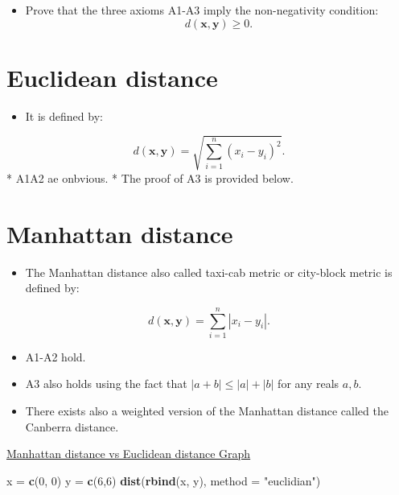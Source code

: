 \documentclass[
]{article}
\newenvironment{Shaded}{\begin{snugshade}}{\end{snugshade}}
\newcommand{\DataTypeTok}[1]{\textcolor[rgb]{0.13,0.29,0.53}{#1}}
\newcommand{\DecValTok}[1]{\textcolor[rgb]{0.00,0.00,0.81}{#1}}
\newcommand{\KeywordTok}[1]{\textcolor[rgb]{0.13,0.29,0.53}{\textbf{#1}}}
\newcommand{\NormalTok}[1]{#1}
\newcommand{\StringTok}[1]{\textcolor[rgb]{0.31,0.60,0.02}{#1}}
\providecommand{\tightlist}{%
  \setlength{\itemsep}{0pt}\setlength{\parskip}{0pt}}
\begin{document}
\begin{itemize}
\tightlist
\item
  Prove that the three axioms A1-A3 imply the non-negativity condition:
  \[d(\mathbf{x},\mathbf{y})\geq 0.\]
\end{itemize}

\hypertarget{euclidean-distance}{%
\section{Euclidean distance}\label{euclidean-distance}}

\begin{itemize}
\tightlist
\item
  It is defined by:
\end{itemize}

\[d(\mathbf{x},\mathbf{y})=\sqrt{\sum_{i=1}^n (x_i-y_i)^2}.\] * A1A2 ae
onbvious. * The proof of A3 is provided below.

\hypertarget{manhattan-distance}{%
\section{Manhattan distance}\label{manhattan-distance}}

\begin{itemize}
\tightlist
\item
  The Manhattan distance also called taxi-cab metric or city-block
  metric is defined by:
\end{itemize}

\[d(\mathbf{x},\mathbf{y})
=\sum_{i=1}^n |x_i-y_i|.
\]

\begin{itemize}
\tightlist
\item
  A1-A2 hold.
\item
  A3 also holds using the fact that \(|a+b|\leq |a|+|b|\) for any reals
  \(a,b\).
\item
  There exists also a weighted version of the Manhattan distance called
  the Canberra distance.
\end{itemize}

\href{https://upload.wikimedia.org/wikipedia/commons/0/08/Manhattan_distance.svg}{Manhattan
distance vs Euclidean distance Graph}

\begin{Shaded}
\begin{Highlighting}[]
\NormalTok{x =}\StringTok{ }\KeywordTok{c}\NormalTok{(}\DecValTok{0}\NormalTok{, }\DecValTok{0}\NormalTok{)}
\NormalTok{y =}\StringTok{ }\KeywordTok{c}\NormalTok{(}\DecValTok{6}\NormalTok{,}\DecValTok{6}\NormalTok{)}
\KeywordTok{dist}\NormalTok{(}\KeywordTok{rbind}\NormalTok{(x, y), }\DataTypeTok{method =} \StringTok{"euclidian"}\NormalTok{)}
\end{Highlighting}
\end{Shaded}
\end{document}
